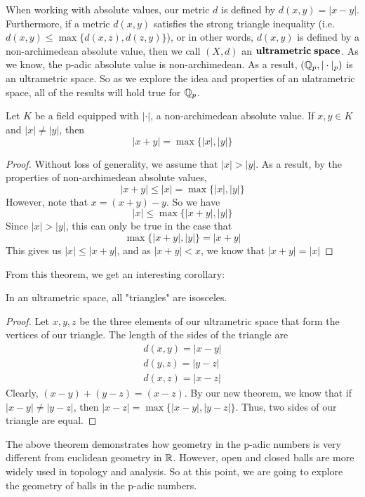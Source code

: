 \documentclass[a4paper]{article}
\begin{document}
When working with absolute values, our metric $d$ is defined by 
\(d(x,y)=|x-y|\).  Furthermore, if a metric $d(x,y)$ satisfies the 
strong triangle inequality (i.e. \(d(x,y)\leq\max\{d(x,z),d(z,y)\}\)),
or in other words, $d(x,y)$ is defined by a non-archimedean
absolute value, then we call $(X,d)$ an $\bf{ultrametric\;space}$.  As
we know, the p-adic absolute value is non-archimedean.  As a result, 
$(\mathbb Q_p,|\cdot|_p)$ is an ultrametric space.  So as we explore
the idea and properties of an ulatrametric space, all of the results will hold
true for \(\mathbb Q_p\).

\begin{theorem}
  Let $K$ be a field equipped with $|\cdot|$, a non-archimedean
  absolute value.  If $x,y\in K$ and $|x|\neq|y|$, then
  \[
  	|x+y|=\max\{|x|,|y|\}
  \]
\end{theorem}
\begin{proof}
Without loss of generality, we assume that \(|x|>|y|\).  As a 
result, by the properties of non-archimedean absolute values,
\[
	|x+y|\leq|x|=\max\{|x|,|y|\}
\]
However, note that \(x=(x+y)-y\).  So we have
\[
	|x|\leq\max\{|x+y|,|y|\}
\]
Since \(|x|>|y|\), this can only be true in the case that
\[
	\max\{|x+y|,|y|\}=|x+y|
\]
This gives us \(|x|\leq|x+y|\), and as \(|x+y|<x\), we know that
\(|x+y|=|x|\)
\end{proof}

From this theorem, we get an interesting corollary:

\begin{corollary}
In an ultrametric space, all "triangles" are isosceles.
\end{corollary}
\begin{proof}
Let $x,y,z$ be the three elements of our ultrametric space that form
the vertices of our triangle.  The length of the sides of the triangle
are 
\[
  \begin{gathered}
    d(x,y)=|x-y|\\
    d(y,z)=|y-z|\\
    d(x,z)=|x-z|
  \end{gathered}
\]
Clearly, \((x-y)+(y-z)=(x-z)\).  By our new theorem, we know that
if \(|x-y|\neq|y-z|\), then \(|x-z|=\max\{|x-y|,|y-z|\}\).  Thus, two
sides of our triangle are equal.
\end{proof}

The above theorem demonstrates how geometry in the p-adic numbers is
very different from euclidean geometry in $\mathbb R$.  However, open and
closed balls are more widely used in topology and analysis.  So at this
point, we are going to explore the geometry of balls in the p-adic
numbers.
\end{document}
